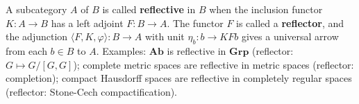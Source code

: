 A subcategory $A$ of $B$ is called \textbf{reflective} in $B$ when the inclusion functor $K: A \to B$ has a left adjoint $F: B \to A$. The functor $F$ is called a \textbf{reflector}, and the adjunction $\langle F, K, \varphi \rangle: B \to A$ with unit $\eta_b: b \to KFb$ gives a universal arrow from each $b \in B$ to $A$. Examples: $\mathbf{Ab}$ is reflective in $\mathbf{Grp}$ (reflector: $G \mapsto G/[G, G]$); complete metric spaces are reflective in metric spaces (reflector: completion); compact Hausdorff spaces are reflective in completely regular spaces (reflector: Stone-Cech compactification).